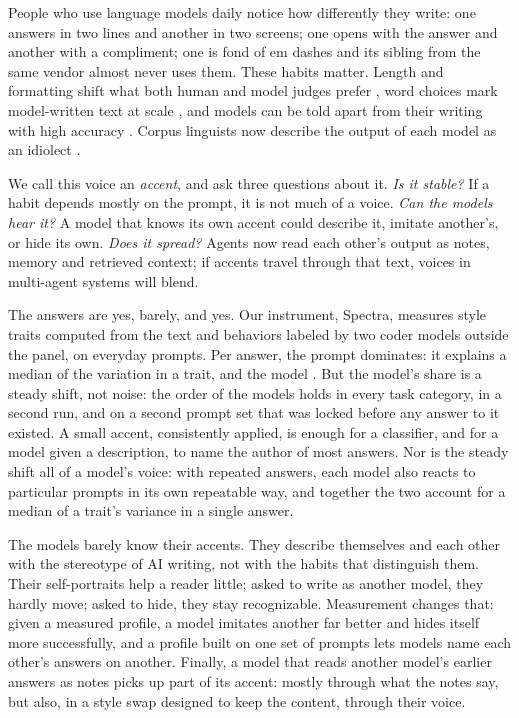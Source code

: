 \documentclass[11pt]{article}
\begin{document}
People who use language models daily notice how differently they write: one answers in two lines and another in two screens; one opens with the answer and another with a compliment; one is fond of em dashes and its sibling from the same vendor almost never uses them.
These habits matter.
Length and formatting shift what both human and model judges prefer \citep{zheng2023judging,dubois2024lengthcontrolled,lmsys2024stylecontrol}, word choices mark model-written text at scale \citep{kobak2024delving}, and models can be told apart from their writing with high accuracy \citep{sun2025idiosyncrasies}.
Corpus linguists now describe the output of each model as an idiolect \citep{rudnicka2026idiolect}.

We call this voice an \emph{accent}, and ask three questions about it.
\emph{Is it stable?} If a habit depends mostly on the prompt, it is not much of a voice.
\emph{Can the models hear it?} A model that knows its own accent could describe it, imitate another's, or hide its own.
\emph{Does it spread?} Agents now read each other's output as notes, memory and retrieved context; if accents travel through that text, voices in multi-agent systems will blend.

The answers are yes, barely, and yes.
Our instrument, Spectra, measures \nStyleTraits{} style traits computed from the text and \nBehaviorTraits{} behaviors labeled by two coder models outside the panel, on \nPrompts{} everyday prompts.
Per answer, the prompt dominates: it explains a median \accentMedPrompt{} of the variation in a trait, and the model \accentMedModel{}.
But the model's share is a steady shift, not noise: the order of the models holds in every task category, in a second run, and on a second prompt set that was locked before any answer to it existed.
A small accent, consistently applied, is enough for a classifier, and for a model given a description, to name the author of most answers.
Nor is the steady shift all of a model's voice: with repeated answers, each model also reacts to particular prompts in its own repeatable way, and together the two account for a median \vcModelReact{} of a trait's variance in a single answer.

The models barely know their accents.
They describe themselves and each other with the stereotype of AI writing, not with the habits that distinguish them.
Their self-portraits help a reader little; asked to write as another model, they hardly move; asked to hide, they stay recognizable.
Measurement changes that: given a measured profile, a model imitates another far better and hides itself more successfully, and a profile built on one set of prompts lets models name each other's answers on another.
Finally, a model that reads another model's earlier answers as notes picks up part of its accent: mostly through what the notes say, but also, in a style swap designed to keep the content, through their voice.
\end{document}
